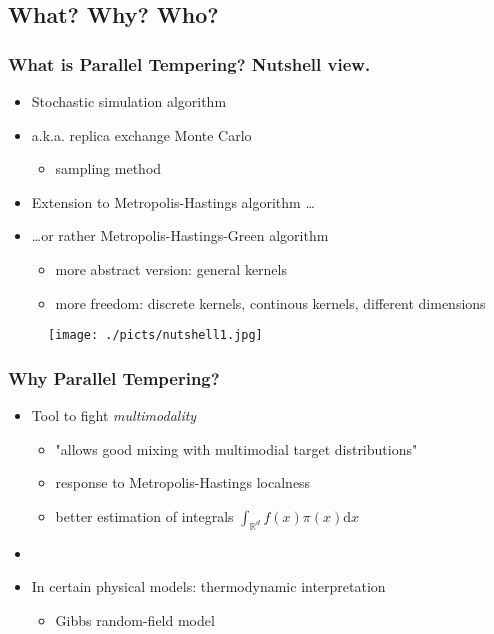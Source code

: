 		\subsection{What? Why? Who?}


\begin{frame}
		\frametitle{What is Parallel Tempering? Nutshell view.}
	
	\begin{itemize}
		\item Stochastic simulation algorithm
		\item a.k.a. replica exchange Monte Carlo 
		\begin{itemize}	
			\item sampling method  
		\end{itemize}
		\item Extension to Metropolis-Hastings algorithm \dots
		\item \dots or rather Metropolis-Hastings-Green algorithm 
		\begin{itemize}
			\item more abstract version: general kernels
			\item more freedom: discrete kernels, continous kernels, different dimensions  
		\end{itemize} 

	\end{itemize}	

	\begin{center}
		\begin{figure}\texttt{[image: ./picts/nutshell1.jpg]}\end{figure}	
	\end{center}

\end{frame}


\begin{frame}
		\frametitle{Why Parallel Tempering? }
	
	\begin{itemize}
		\item Tool to fight \emph{ multimodality }
		\begin{itemize}
			\item "allows good mixing with multimodial target distributions"
			\item response to Metropolis-Hastings localness    
			\item better estimation of integrals $ \int_{\mathbb{R}^d} f(x) \pi(x) \mathrm{d} x $
		\end{itemize}
		\item[] 

		\item In certain physical models: thermodynamic interpretation
		\begin{itemize}
			\item Gibbs random-field model
		\end{itemize}
	\end{itemize}	

\end{frame}

